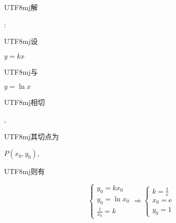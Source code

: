 \documentclass[10pt]{article}
\begin{document}
\begin{CJK}{UTF8}{mj}解\end{CJK}: \begin{CJK}{UTF8}{mj}设\end{CJK} $y=k x$ \begin{CJK}{UTF8}{mj}与\end{CJK} $y=\ln x$ \begin{CJK}{UTF8}{mj}相切\end{CJK}, \begin{CJK}{UTF8}{mj}其切点为\end{CJK} $P\left(x_{0}, y_{0}\right)$, \begin{CJK}{UTF8}{mj}则有\end{CJK}
$$
\left\{\begin{array} { l } 
{ y _ { 0 } = k x _ { 0 } } \\
{ y _ { 0 } = \operatorname { l n } x _ { 0 } } \\
{ \frac { 1 } { x _ { 0 } } = k }
\end{array} \Rightarrow \left\{\begin{array}{l}
k=\frac{1}{\mathrm{e}} \\
x_{0}=\mathrm{e} \\
y_{0}=1
\end{array}\right.\right.
$$
\end{document}
